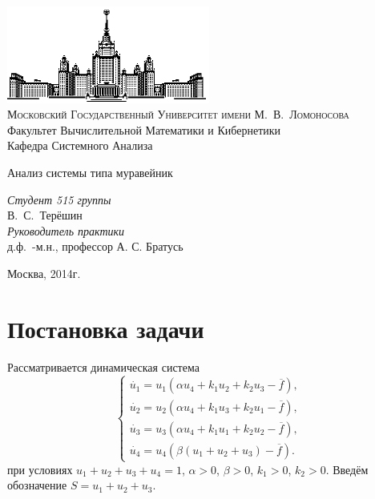 \documentclass[12pt]{article}
\theoremstyle{rusdef}
\begin{document}
	\thispagestyle{empty}
	
	\begin{center}
		\ \vspace{-3cm}
		
		\includegraphics[width=0.5\textwidth]{msu.eps}\\
		
		{\scshape Московский Государственный Университет имени М.~В.~Ломоносова}\\
		Факультет Вычислительной Математики и Кибернетики\\
		Кафедра Системного Анализа
		\vfill
		
		{\LARGE Анализ системы типа муравейник}
		\vspace{.5cm}
		
	\end{center}
	
	\vspace{1cm}
	
	\begin{flushright}
		\large
		\textit{Студент 515 группы}\\
		В.~С.~Терёшин\\
		\vspace{5mm}
		\textit{Руководитель практики}\\
		д.ф.~-м.н., профессор А. С. Братусь
		
	\end{flushright}
	
	\vfill
	
	\begin{center}
		{\large
			Москва, 2014г.}
	\end{center}
	
	\newpage
	\tableofcontents
	\newpage
	
	\section{Постановка задачи}
	
	Рассматривается динамическая система
	$$
	\left\{
	\begin{aligned}
	\dot{u_1} = u_1 \left( \alpha u_4 + k_1 u_2 + k_2 u_3 - \overline{f} \right), \\
	\dot{u_2} = u_2 \left( \alpha u_4 + k_1 u_3 + k_2 u_1 - \overline{f} \right), \\
	\dot{u_3} = u_3 \left( \alpha u_4 + k_1 u_1 + k_2 u_2 - \overline{f} \right), \\
	\dot{u_4} = u_4 \left( \beta \left( u_1 + u_2 + u_3 \right) - \overline{f} \right).
	\end{aligned}
	\right.
	$$
	при условиях $u_1 + u_2 + u_3 + u_4 = 1$, $\alpha > 0$, $\beta > 0$, $k_1 > 0$, $k_2 > 0$. Введём обозначение $S = u_1 + u_2 + u_3$.
	
\end{document}
